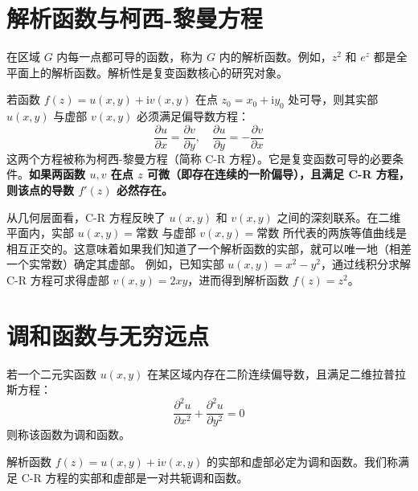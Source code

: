 \section{解析函数与柯西-黎曼方程}

\begin{definition}[解析函数]
在区域 \(G\) 内每一点都可导的函数，称为 \(G\) 内的解析函数。例如，\(z^2\) 和 \(e^z\) 都是全平面上的解析函数。解析性是复变函数核心的研究对象。
\end{definition}

\begin{theorem}
若函数 \(f(z) = u(x, y) + \mathrm{i}v(x, y)\) 在点 \(z_0 = x_0 + \mathrm{i}y_0\) 处可导，则其实部 \(u(x,y)\) 与虚部 \(v(x,y)\) 必须满足偏导数方程：
\[
\frac{\partial u}{\partial x} = \frac{\partial v}{\partial y}, \quad \frac{\partial u}{\partial y} = -\frac{\partial v}{\partial x}
\]
这两个方程被称为柯西-黎曼方程（简称 C-R 方程）。它是复变函数可导的必要条件。\textbf{如果两函数 \(u, v\) 在点 \(z\) 可微（即存在连续的一阶偏导），且满足 C-R 方程，则该点的导数 \(f'(z)\) 必然存在。}
\end{theorem}

\begin{remark}
从几何层面看，C-R 方程反映了 \(u(x,y)\) 和 \(v(x,y)\) 之间的深刻联系。在二维平面内，实部 \(u(x,y) = \text{常数}\) 与虚部 \(v(x,y) = \text{常数}\) 所代表的两族等值曲线是相互正交的。这意味着如果我们知道了一个解析函数的实部，就可以唯一地（相差一个实常数）确定其虚部。
例如，已知实部 \(u(x,y) = x^2 - y^2\)，通过线积分求解 C-R 方程可求得虚部 \(v(x,y) = 2xy\)，进而得到解析函数 \(f(z) = z^2\)。
\end{remark}

\section{调和函数与无穷远点}

\begin{definition}[调和函数]
若一个二元实函数 \(u(x,y)\) 在某区域内存在二阶连续偏导数，且满足二维拉普拉斯方程：
\[
\frac{\partial^2 u}{\partial x^2} + \frac{\partial^2 u}{\partial y^2} = 0
\]
则称该函数为调和函数。
\end{definition}

\begin{theorem}[共轭调和函数]
解析函数 \(f(z) = u(x,y) + \mathrm{i}v(x,y)\) 的实部和虚部必定为调和函数。我们称满足 C-R 方程的实部和虚部是一对共轭调和函数。
\end{theorem}

